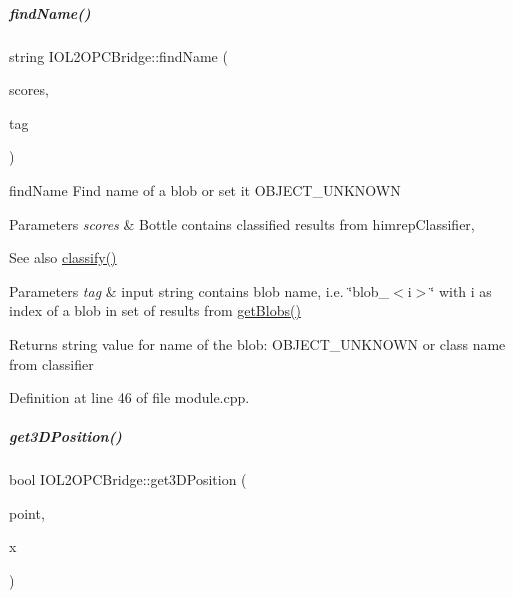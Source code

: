\mbox{\label{group__iol2opc_a5e0675c4593af9ce2c6a04c77732811a}} 
\subparagraph{\texorpdfstring{find\+Name()}{findName()}}
{\footnotesize\ttfamily string I\+O\+L2\+O\+P\+C\+Bridge\+::find\+Name (\begin{DoxyParamCaption}\item[{const Bottle \&}]{scores,  }\item[{const string \&}]{tag }\end{DoxyParamCaption})\hspace{0.3cm}{\ttfamily [protected]}}



find\+Name Find name of a blob or set it O\+B\+J\+E\+C\+T\+\_\+\+U\+N\+K\+N\+O\+WN 


\begin{DoxyParams}{Parameters}
{\em scores} & Bottle contains classified results from himrep\+Classifier, \\
\hline
\end{DoxyParams}
\begin{DoxySeeAlso}{See also}
\hyperlink{group__iol2opc_a372d6a1015753163ed2fc7fa1838bff5}{classify()} 
\end{DoxySeeAlso}

\begin{DoxyParams}{Parameters}
{\em tag} & input string contains blob name, i.\+e. \char`\"{}blob\+\_\+$<$i$>$\char`\"{} with i as index of a blob in set of results from \hyperlink{group__iol2opc_a628771932e6423ccd5963290558436b7}{get\+Blobs()} \\
\hline
\end{DoxyParams}
\begin{DoxyReturn}{Returns}
string value for name of the blob\+: O\+B\+J\+E\+C\+T\+\_\+\+U\+N\+K\+N\+O\+WN or class name from classifier 
\end{DoxyReturn}


Definition at line 46 of file module.\+cpp.

\mbox{\label{group__iol2opc_af32fec2950ca87ee525c38168b02571b}} 
\subparagraph{\texorpdfstring{get3\+D\+Position()}{get3DPosition()}}
{\footnotesize\ttfamily bool I\+O\+L2\+O\+P\+C\+Bridge\+::get3\+D\+Position (\begin{DoxyParamCaption}\item[{const Cv\+Point \&}]{point,  }\item[{Vector \&}]{x }\end{DoxyParamCaption})\hspace{0.3cm}{\ttfamily [protected]}}



